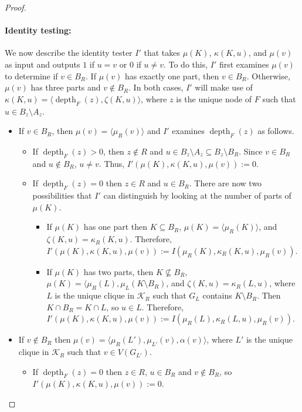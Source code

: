 \documentclass{patmorin}
\DeclareMathOperator{\depth}{depth}
\begin{document}
\begin{proof}
    \paragraph{Identity testing:}  We now describe the identity tester $I'$ that takes $\mu(K)$, $\kappa(K,u)$, and $\mu(v)$ as input and outputs $1$ if $u=v$ or $0$ if $u\neq v$.  To do this, $I'$ first examines $\mu(v)$ to determine if $v\in B_R$.  If $\mu(v)$ has exactly one part, then $v\in B_R$. Otherwise, $\mu(v)$ has three parts and $v\not\in B_R$.
    In both cases, $I'$ will make use of $\kappa(K,u)=\langle\depth_F(z),\zeta(K,u)\rangle$, where $z$ is the unique node of $F$ such that $u\in B_z\setminus A_z$.
    \begin{itemize}
      \item If $v\in B_R$, then $\mu(v)=\langle\mu_R(v)\rangle$ and $I'$ examines  $\depth_F(z)$ as follows.
      \begin{itemize}
        \item If $\depth_F(z)> 0$, then $z\not\in R$ and $u\in B_z\setminus A_z\subseteq B_z\setminus B_R$.  Since $v\in B_R$ and $u\not\in B_R$, $u\neq v$.  Thus, $I'(\mu(K),\kappa(K,u),\mu(v)):=0$.

        \item If $\depth_F(z)=0$ then $z\in R$ and $u\in B_R$.   There are now two possibilities that $I'$ can distinguish by looking at the number of parts of $\mu(K)$.
        \begin{itemize}
          \item If $\mu(K)$ has one part then $K\subseteq B_R$,  $\mu(K)=\langle \mu_R(K)\rangle$, and $\zeta(K,u)=\kappa_R(K,u)$.  Therefore, $I'(\mu(K),\kappa(K,u),\mu(v)):=I(\mu_R(K),\kappa_R(K,u),\mu_R(v))$.
          \item If $\mu(K)$ has two parts, then $K\not\subseteq B_R$, $\mu(K)=\langle \mu_R(L),\mu_L(K\setminus B_R)$, and  $\zeta(K,u)=\kappa_R(L,u)$, where $L$ is the unique clique in $\mathcal{K}_R$ such that $G_L$ contains $K\setminus B_R$.  Then $K\cap B_R=K\cap L$, so $u\in L$. Therefore, $I'(\mu(K),\kappa(K,u),\mu(v)):=I(\mu_R(L),\kappa_R(L,u),\mu_R(v))$.
      \end{itemize}
      \end{itemize}
      \item If $v\not\in B_R$ then $\mu(v)=\langle \mu_R(L'),\mu_{L'}(v),\alpha(v)\rangle$, where $L'$ is the unique clique in $\mathcal{K}_R$ such that $v\in V(G_{L'})$.
      \begin{itemize}
          \item If $\depth_F(z)=0$ then $z\in R$, $u\in B_R$ and $v\not\in B_R$, so $I'(\mu(K),\kappa(K,u),\mu(v)):=0$.


\end{itemize}
\end{itemize}
\end{proof}
\end{document}
